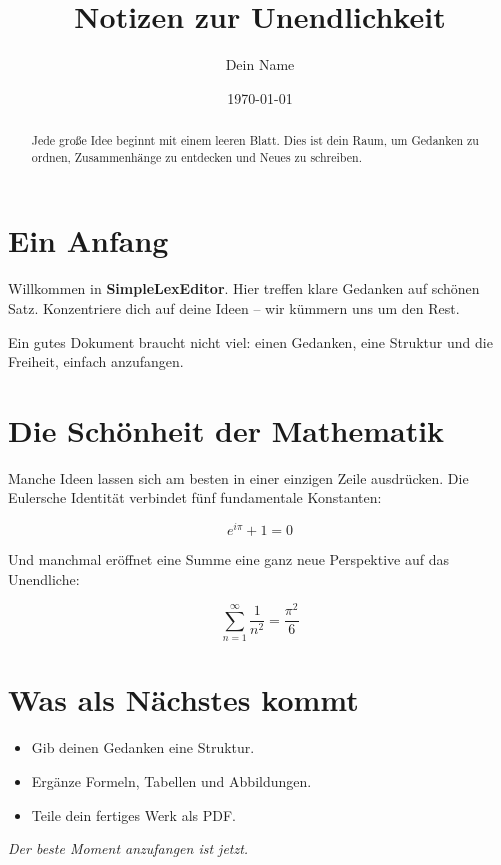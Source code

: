 \documentclass[11pt,a4paper]{article}
\title{Notizen zur Unendlichkeit}
\author{Dein Name}
\date{\today}
\begin{document}
\maketitle

\begin{abstract}
Jede große Idee beginnt mit einem leeren Blatt.
Dies ist dein Raum, um Gedanken zu ordnen,
Zusammenhänge zu entdecken und Neues zu schreiben.
\end{abstract}

\section{Ein Anfang}
Willkommen in \textbf{SimpleLexEditor}. Hier treffen klare
Gedanken auf schönen Satz. Konzentriere dich auf
deine Ideen -- wir kümmern uns um den Rest.

Ein gutes Dokument braucht nicht viel: einen
Gedanken, eine Struktur und die Freiheit,
einfach anzufangen.

\section{Die Schönheit der Mathematik}
Manche Ideen lassen sich am besten in einer
einzigen Zeile ausdrücken. Die Eulersche Identität
verbindet fünf fundamentale Konstanten:

\begin{equation}
  e^{i\pi} + 1 = 0
\end{equation}

Und manchmal eröffnet eine Summe eine ganz
neue Perspektive auf das Unendliche:

\[
  \sum_{n=1}^{\infty} \frac{1}{n^2}
  = \frac{\pi^2}{6}
\]

\section{Was als Nächstes kommt}
\begin{itemize}
  \item Gib deinen Gedanken eine Struktur.
  \item Ergänze Formeln, Tabellen und Abbildungen.
  \item Teile dein fertiges Werk als PDF.
\end{itemize}

\bigskip
\noindent\textit{Der beste Moment anzufangen ist jetzt.}
\end{document}
